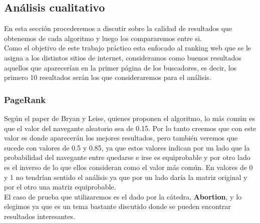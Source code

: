\subsection{Análisis cualitativo}

En esta sección procederemos a discutir sobre la calidad de resultados que obtenemos de cada algoritmo y luego los compararemos entre si.\\
Como el objetivo de este trabajo práctico esta enfocado al ranking web que se le asigna a los distintos sitios de internet, consideramos como buenos resultados aquellos que aparecerían en la primer página de los buscadores, es decir, los primero 10 resultados serán los que consideraremos para el análisis.

\subsubsection{PageRank}
Según el paper de Bryan y Leise, quienes proponen el algoritmo, lo más común es que el valor del navegante aleatorio sea de 0.15. Por lo tanto creemos que con este valor es donde aparecerán los mejores resultados, pero también veremos que sucede con valores de 0.5 y 0.85, ya que estos valores indican por un lado que la probabilidad del navegante entre quedarse e irse es equiprobable y por otro lado es el inverso de lo que ellos consideran como el valor más común. En valores de 0 y 1 no tendrían sentido el análisis ya que por un lado daría la matriz original y por el otro una matriz equiprobable.\\
El caso de prueba que utilizaremos es el dado por la cátedra, \textbf{Abortion}, y lo elegimos ya que es un tema bastante discutido donde se pueden encontrar resultados interesantes.


